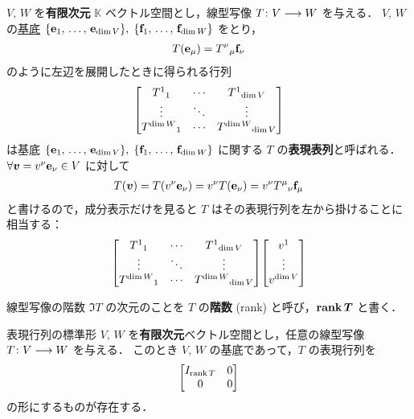 \documentclass[geometry_main]{subfiles}
\begin{document}
$V,\, W$ を\textbf{有限次元} $\mathbb{K}$ ベクトル空間とし，線型写像 $T \colon V \longrightarrow W$ を与える．
$V,\, W$ の\hyperref[def:free-mod]{基底} $\{\vb{e}_1,\, \dots,\, \vb{e}_{\dim V}\},\; \{\vb{f}_1,\, \dots,\, \vb{f}_{\dim W}\}$ をとり，
\begin{align}
	T(\vb{e}_\mu) = T^\nu{}_{\mu} \vb{f}_\nu
\end{align}
のように左辺を展開したときに得られる行列
\begin{align}
	\mqty[T^1{}_1 & \cdots &T^1{}_{\dim V} \\ \vdots &\ddots &\vdots \\ T^{\dim W}{}_1 &\cdots &T^{\dim W}{}_{\dim V}]
\end{align}
は基底 $\{\vb{e}_1,\, \dots,\, \vb{e}_{\dim V}\},\; \{\vb{f}_1,\, \dots,\, \vb{f}_{\dim W}\}$ に関する $T$ の\textbf{表現表列}と呼ばれる．
$\forall \bm{v} = v^\nu \vb{e}_\nu \in V$ に対して
\begin{align}
	T(\bm{v}) = T(v^\nu \vb{e}_\nu) = v^\nu T(\vb{e}_\nu) = v^\nu T^\mu{}_{\nu} \vb{f}_\mu
\end{align}
と書けるので，成分表示だけを見ると $T$ はその表現行列を左から掛けることに相当する：
\begin{align}
	\mqty[T^1{}_1 & \cdots &T^1{}_{\dim V} \\ \vdots &\ddots &\vdots \\ T^{\dim W}{}_1 &\cdots &T^{\dim W}{}_{\dim V}] \mqty[v^1 \\ \vdots \\ v^{\dim V}]
\end{align}

\begin{mydef}[label=def:rank]{線型写像の階数}
	$\Im T$ の次元のことを $T$ の\textbf{階数} (rank) と呼び，$\bm{\rank T}$ と書く．
\end{mydef}

\begin{myprop}[label=prop:canonical-matrix]{表現行列の標準形}
	$V,\, W$ を\textbf{有限次元}ベクトル空間とし，任意の線型写像 $T \colon V \longrightarrow W$ を与える．
	このとき $V,\, W$ の基底であって，$T$ の表現行列を
	\begin{align}
		\mqty[I_{\rank T} & 0 \\ 0 & 0]
	\end{align}
	の形にするものが存在する．
\end{myprop}
\end{document}

